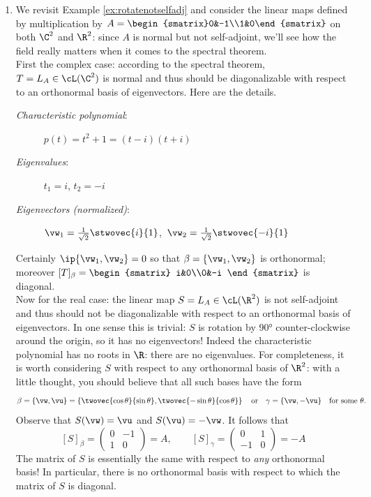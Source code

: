 \begin{examples}[label=exs:specthm]
\begin{enumerate}
	\item We revisit Example \ref{ex:rotatenotselfadj} and consider the linear maps defined by multiplication by $A=\begin{smatrix}0&-1\\1&0\end{smatrix}$ on both $\C^2$ and $\R^2$: since $A$ is normal but not self-adjoint, we'll see how the field really matters when it comes to the spectral theorem.\\[8pt]
	First the complex case: according to the spectral theorem, $T=L_A\in\cL(\C^2)$ is normal and thus should be diagonalizable with respect to an orthonormal basis of eigenvectors. Here are the details.
	\begin{description}
	  \item[\normalfont\emph{Characteristic polynomial}:] $p(t)=t^2+1=(t-i)(t+i)$
	  \item[\normalfont\emph{Eigenvalues}:] $t_1=i$, $t_2=-i$
	  \item[\normalfont\emph{Eigenvectors (normalized)}:] $\vw_1=\frac 1{\sqrt{2}}\stwovec{i}{1}$,\ $\vw_2=\frac 1{\sqrt{2}}\stwovec{-i}{1}$
	\end{description}
	Certainly $\ip{\vw_1,\vw_2}=0$ so that $\beta=\{\vw_1,\vw_2\}$ is orthonormal; moreover $[T]_\beta=\begin{smatrix}
	i&0\\0&-i
	\end{smatrix}$ is diagonal.\\[8pt]	
	Now for the real case: the linear map $S=L_A\in\cL(\R^2)$ is not self-adjoint and thus should not be diagonalizable with respect to an orthonormal basis of eigenvectors. In one sense this is trivial: $S$ is rotation by \ang{90} counter-clockwise around the origin, so it has no eigenvectors! Indeed the characteristic polynomial has no roots in $\R$: there are no eigenvalues. For completeness, it is worth considering $S$ with respect to any orthonormal basis of $\R^2$: with a little thought, you should believe that all such bases have the form
\[\beta=\{\vw,\vu\}=\left\{\twovec{\cos\theta}{\sin\theta},\twovec{-\sin\theta}{\cos\theta}\right\}\quad\text{or}\quad\gamma=\{\vw,-\vu\}\quad\text{for some $\theta$.}\]
Observe that $S(\vw)=\vu$ and $S(\vu)=-\vw$. It follows that
\[[S]_\beta=\begin{pmatrix}
0&-1\\
1&0
\end{pmatrix}=A,\qquad [S]_\gamma=\begin{pmatrix}
0&1\\
-1&0
\end{pmatrix}=-A\]
The matrix of $S$ is essentially the same with respect to \emph{any} orthonormal basis! In particular, there is no orthonormal basis with respect to which the matrix of $S$ is diagonal.
\end{enumerate}
\end{examples}


